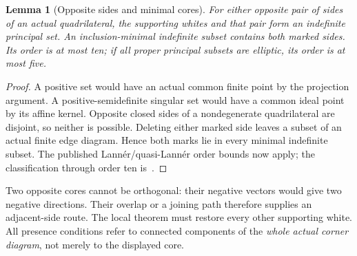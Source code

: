 \documentclass[11pt]{article}
\newtheorem{lemma}[theorem]{Lemma}
\theoremstyle{remark}\newtheorem{remark}[theorem]{Remark}
\numberwithin{equation}{section}
\begin{document}
\begin{lemma}[Opposite sides and minimal cores]\label{fv:lem:opposite-cores}
For either opposite pair of sides of an actual quadrilateral, the
supporting whites and that pair form an indefinite principal set.
An inclusion-minimal indefinite subset contains both marked sides.
Its order is at most ten; if all proper principal subsets are
elliptic, its order is at most five.
\end{lemma}
\begin{proof}
A positive set would have an actual common finite point by the
projection argument. A positive-semidefinite singular set would
have a common ideal point by its affine kernel. Opposite closed
sides of a nondegenerate quadrilateral are disjoint, so neither is
possible. Deleting either marked side leaves a subset of an actual
finite edge diagram. Hence both marks lie in every minimal
indefinite subset. The published Lann\'er/quasi-Lann\'er order
bounds now apply; the classification through order ten
is~\cite{Chein}.
\end{proof}

Two opposite cores cannot be orthogonal: their negative vectors
would give two negative directions. Their overlap or a joining
path therefore supplies an adjacent-side route. The local theorem
must restore every other supporting white. All presence conditions
refer to connected components of the \emph{whole actual corner
diagram}, not merely to the displayed core.
\end{document}
